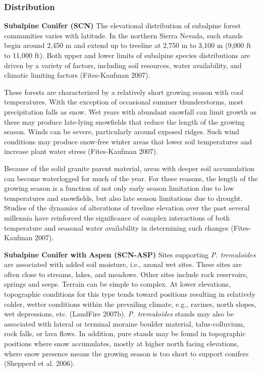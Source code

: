 \subsubsection{Distribution}
\textbf{Subalpine Conifer (SCN)} The elevational distribution of subalpine forest communities varies with latitude. In the northern Sierra Nevada, such stands begin around 2,450 m and extend up to treeline at 2,750 m to 3,100 m (9,000 ft to 11,000 ft). Both upper and lower limits of subalpine species distributions are driven by a variety of factors, including soil resources, water availability, and climatic limiting factors (Fites-Kaufman 2007).

These forests are characterized by a relatively short growing season with cool temperatures. With the exception of occasional summer thunderstorms, most precipitation falls as snow. Wet years with abundant snowfall can limit growth as these may produce late-lying snowfields that reduce the length of the growing season. Winds can be severe, particularly around exposed ridges. Such wind conditions may produce snow-free winter areas that lower soil temperatures and increase plant water stress (Fites-Kaufman 2007).

Because of the solid granite parent material, areas with deeper soil accumulation can become waterlogged for much of the year. For these reasons, the length of the growing season is a function of not only early season limitation due to low temperatures and snowfields, but also late season limitations due to drought. Studies of the dynamics of alterations of treeline elevation over the past several millennia have reinforced the significance of complex interactions of both temperature and seasonal water availability in determining such changes (Fites-Kaufman 2007). 


\textbf{Subalpine Conifer with Aspen (SCN-ASP)} Sites supporting \emph{P. tremuloides} are associated with added soil moisture, i.e., azonal wet sites. These sites are often close to streams, lakes, and meadows. Other sites include rock reservoirs, springs and seeps. Terrain can be simple to complex. At lower elevations, topographic conditions for this type tends toward positions resulting in relatively colder, wetter conditions within the prevailing climate, e.g., ravines, north slopes, wet depressions, etc. (LandFire 2007b). \emph{P. tremuloides} stands may also be associated with lateral or terminal moraine boulder material, talus-colluvium, rock falls, or lava flows. In addition, pure stands may be found in topographic positions where snow accumulates, mostly at higher north facing elevations, where snow presence means the growing season is too short to support conifers (Shepperd et al. 2006).

